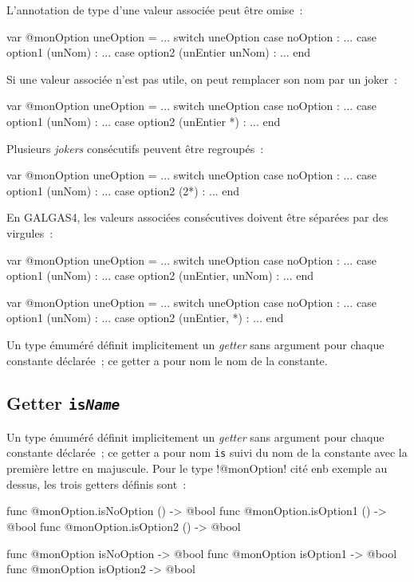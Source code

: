 L'annotation de type d'une valeur associée peut être omise~:

\begin{galgas4}
var @monOption uneOption = ...
switch uneOption
case noOption : ...
case option1 (unNom) : ...
case option2 (unEntier unNom) : ...
end
\end{galgas4}

Si une valeur associée n'est pas utile, on peut remplacer son nom par un joker~:
\begin{galgas4}
var @monOption uneOption = ...
switch uneOption
case noOption : ...
case option1 (unNom) : ...
case option2 (unEntier *) : ...
end
\end{galgas4}

Plusieurs \emph{jokers} consécutifs peuvent être regroupés~:

\begin{galgas4}
var @monOption uneOption = ...
switch uneOption
case noOption : ...
case option1 (unNom) : ...
case option2 (2*) : ...
end
\end{galgas4}

En GALGAS4, les valeurs associées consécutives doivent être séparées par des virgules~:

\begin{galgas4}
var @monOption uneOption = ...
switch uneOption
case noOption : ...
case option1 (unNom) : ...
case option2 (unEntier, unNom) : ...
end
\end{galgas4}

\begin{galgas4}
var @monOption uneOption = ...
switch uneOption
case noOption : ...
case option1 (unNom) : ...
case option2 (unEntier, *) : ...
end
\end{galgas4}







Un type émuméré définit implicitement un \emph{getter} sans argument pour chaque constante déclarée~; ce getter a pour nom le nom de la constante.

\subsection{Getter \texttt{is\emph{Name}}}

Un type émuméré définit implicitement un \emph{getter} sans argument pour chaque constante déclarée~; ce getter a pour nom \texttt{is} suivi du nom de la constante avec la première lettre en majuscule. Pour le type \ggsq!@monOption! cité enb exemple au dessus, les trois getters définis sont~:
\begin{galgas4}
func @monOption.isNoOption () -> @bool
func @monOption.isOption1 () -> @bool
func @monOption.isOption2 () -> @bool
\end{galgas4}
\begin{galgas4}
func @monOption isNoOption -> @bool
func @monOption isOption1 -> @bool
func @monOption isOption2 -> @bool
\end{galgas4}

